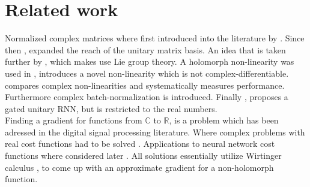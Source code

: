 \documentclass{article}
\begin{document}
\section{Related work}
Normalized complex matrices where first introduced into the literature by \cite{Arjovsky}. Since then \cite{Wisdom}, expanded the reach of the unitary matrix basis. An idea that is taken further by \cite{Hyland}, which makes use Lie group theory.  
A holomorph non-linearity was used in \cite{Guberman}, \cite{Arjovsky} introduces a novel non-linearity which is not complex-differentiable. \cite{Trabelsi} compares complex non-linearities and systematically measures performance. Furthermore complex batch-normalization is introduced.
Finally \cite{Jing}, proposes a gated unitary RNN, but is restricted to the real numbers. \\
Finding a gradient for functions from $\mathbb{C}$ to $\mathbb{R}$, is a problem which has been adressed in the digital signal processing literature. Where complex problems with real cost functions had to be solved \cite{Brandwood}\cite{Bos}\cite{Franken}\cite{Delgado}. Applications to neural network cost functions where considered later \cite{Mandic}. All solutions essentially utilize Wirtinger calculus \cite{Wirtinger}, to come up with an approximate gradient for a non-holomorph function.
\end{document}
